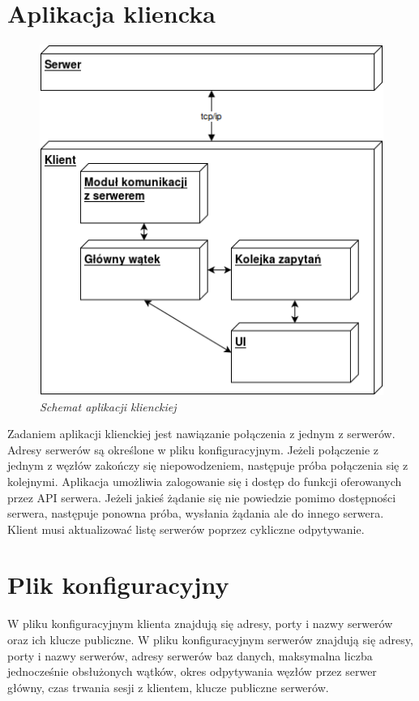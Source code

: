 \section{Aplikacja kliencka}

\begin{figure}[!h]
    \begin{center}
    \includegraphics[angle=0,scale=0.8]{img/client.png}
    \end{center}
    \caption{\em Schemat aplikacji klienckiej}
    \label{fig:client}
\end{figure}

Zadaniem aplikacji klienckiej jest nawiązanie połączenia z jednym z serwerów. Adresy serwerów są określone w pliku konfiguracyjnym. Jeżeli połączenie z jednym z węzłów zakończy się niepowodzeniem, następuje próba połączenia się z kolejnymi. Aplikacja umożliwia zalogowanie się i dostęp do funkcji oferowanych przez API serwera. Jeżeli jakieś żądanie się nie powiedzie pomimo dostępności serwera, następuje ponowna próba, wysłania żądania ale do innego serwera.
Klient musi aktualizować listę serwerów poprzez cykliczne odpytywanie.

\section{Plik konfiguracyjny}

W pliku konfiguracyjnym klienta znajdują się adresy, porty i nazwy serwerów oraz ich klucze publiczne.
W pliku konfiguracyjnym serwerów znajdują się adresy, porty i nazwy serwerów, adresy serwerów baz danych, maksymalna liczba jednocześnie obsłużonych wątków, okres odpytywania węzłów przez serwer główny, czas trwania sesji z klientem, klucze publiczne serwerów.
